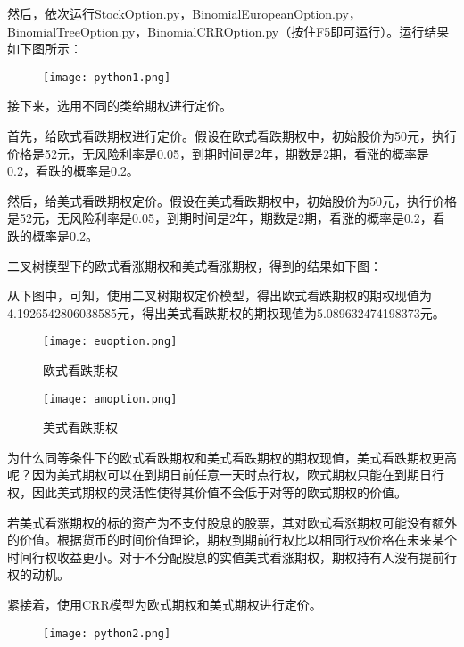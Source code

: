	然后，依次运行StockOption.py，BinomialEuropeanOption.py，BinomialTreeOption.py，BinomialCRROption.py（按住F5即可运行）。运行结果如下图所示：
	
	\begin{figure}[htb] %
		\centering
		\texttt{[image: python1.png]}
		\label{fig:xfig1}
	\end{figure}
	
	接下来，选用不同的类给期权进行定价。
	
	首先，给欧式看跌期权进行定价。假设在欧式看跌期权中，初始股价为50元，执行价格是52元，无风险利率是0.05，到期时间是2年，期数是2期，看涨的概率是0.2，看跌的概率是0.2。

	然后，给美式看跌期权定价。假设在美式看跌期权中，初始股价为50元，执行价格是52元，无风险利率是0.05，到期时间是2年，期数是2期，看涨的概率是0.2，看跌的概率是0.2。
	
	二叉树模型下的欧式看涨期权和美式看涨期权，得到的结果如下图：
	
	从下图中，可知，使用二叉树期权定价模型，得出欧式看跌期权的期权现值为4.1926542806038585元，得出美式看跌期权的期权现值为5.089632474198373元。
	\begin{figure}
		\begin{minipage}{0.48\textwidth}
			\centering
			\texttt{[image: euoption.png]}
			\caption{欧式看跌期权}
			\label{fig:parallel1}
		\end{minipage}\hfill
		\begin{minipage}{0.48\textwidth}
			\centering
			\texttt{[image: amoption.png]}
			\caption{美式看跌期权}
			\label{fig:parallel2}
		\end{minipage}
	\end{figure}

	为什么同等条件下的欧式看跌期权和美式看跌期权的期权现值，美式看跌期权更高呢？因为美式期权可以在到期日前任意一天时点行权，欧式期权只能在到期日行权，因此美式期权的灵活性使得其价值不会低于对等的欧式期权的价值。
	
	若美式看涨期权的标的资产为不支付股息的股票，其对欧式看涨期权可能没有额外的价值。根据货币的时间价值理论，期权到期前行权比以相同行权价格在未来某个时间行权收益更小。对于不分配股息的实值美式看涨期权，期权持有人没有提前行权的动机。

	紧接着，使用CRR模型为欧式期权和美式期权进行定价。
	
	\begin{figure}[htb] %
		\centering
		\texttt{[image: python2.png]}
		\label{fig:xfig1}
	\end{figure}



